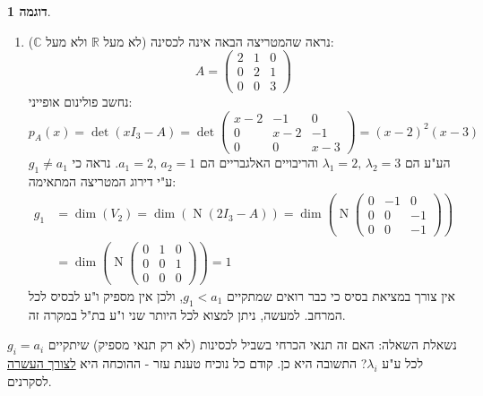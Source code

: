 \documentclass[12pt]{report}
\theoremstyle{plain}
\theoremstyle{definition}
\newtheorem{example}{דוגמה}[chapter]
\newcommand{\R}{\mathbb{R}}
\newcommand{\C}{\mathbb{C}}
\newcommand{\0}{\mathbf{0}}
\DeclareMathOperator{\Null}{N}
\begin{document}
\begin{example}
\begin{enumerate}[label=\alph*.]
כל סדר אחר הוא גם לגיטימי ובלבד שיש עקביות בין המטריצה ההפיכה למטריצה האלכסונית. למשל:
$$
P'=\begin{pmatrix}
1 & -1 & -1\\
1 & 1 & 0\\
1 & 0 & 1
\end{pmatrix}\quad,\quad D'=\begin{pmatrix}
3 & 0 & 0\\
0 & 0 & 0\\
0 & 0 & 0
\end{pmatrix}
$$

מקובל לכתוב בסמיכות ו"ע המתאימים לאותו ע"ע.

\item 
נראה שהמטריצה הבאה אינה לכסינה (לא מעל 
$\R$
ולא מעל
$\C$):
$$
A=\begin{pmatrix}
2 & 1 & 0 \\
0 & 2 & 1 \\
0 & 0 & 3
\end{pmatrix}
$$
נחשב פולינום אופייני:
$$
p_A(x)=\det(xI_3-A)=\det\begin{pmatrix}
x-2 & -1 & 0 \\
0 & x-2 & -1 \\
0 & 0 & x-3
\end{pmatrix}=(x-2)^2(x-3)
$$
הע"ע הם 
$\lambda_1=2,\,\lambda_2=3$ 
והריבויים האלגבריים הם
$a_1=2,\,a_2=1$.
נראה כי
$g_1\neq a_1$
ע"י דירוג המטריצה המתאימה:
$$
\begin{aligned}
g_1&=\dim(V_2)=\dim\left(\Null(2I_3-A)\right)=\dim\left(\Null\begin{pmatrix}
0 & -1 & 0 \\
0 & 0 & -1 \\
0 & 0 & -1
\end{pmatrix}\right)\\
&=\dim\left(\Null\begin{pmatrix}
0 & 1 & 0 \\
0 & 0 & 1 \\
0 & 0 & 0
\end{pmatrix}\right)=1
\end{aligned}
$$
אין צורך במציאת בסיס כי כבר רואים שמתקיים
$g_1<a_1$,
ולכן אין מספיק ו"ע לבסיס לכל המרחב. למעשה, ניתן למצוא לכל היותר שני ו"ע בת"ל במקרה זה.


\end{enumerate}
\end{example}

נשאלת השאלה: האם זה תנאי הכרחי בשביל לכסינות (לא רק תנאי מספיק) שיתקיים 
$g_i=a_i$
לכל ע"ע
$\lambda_i$?
התשובה היא כן. קודם כל נוכיח טענת עזר - ההוכחה היא
\underline{לצורך העשרה}
לסקרנים.
\end{document}
